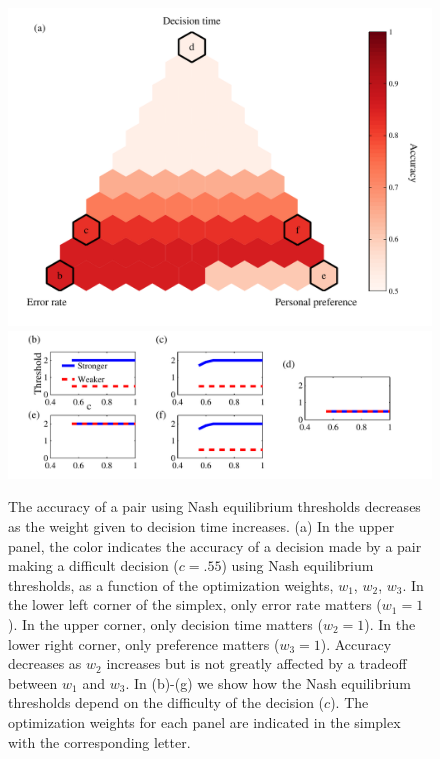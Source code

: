 \documentclass{article}
\begin{document}
\begin{figure}[ht]
\includegraphics[]{pairwise_accuracy.pdf}
\includegraphics[]{nasheq_thresholds.pdf}
\caption{\label{nasheq} The accuracy of a pair using Nash equilibrium thresholds decreases as the weight given to decision time increases.  (a) In the upper panel, the color indicates the accuracy of a decision made by a pair making a difficult decision ($c=.55$) using Nash equilibrium thresholds, as a function of the optimization weights, $w_1$, $w_2$, $w_3$.  In the lower left corner of the simplex, only error rate matters ($w_1=1$).  In the upper corner, only decision time matters ($w_2=1$).  In the lower right corner, only preference matters ($w_3=1$). Accuracy decreases as $w_2$ increases but is not greatly affected by a tradeoff between $w_1$ and $w_3$. In (b)-(g) we show how the Nash equilibrium thresholds depend on the difficulty of the decision ($c$). The optimization weights for each panel are indicated in the simplex with the corresponding letter.  }
\end{figure}
\end{document}
